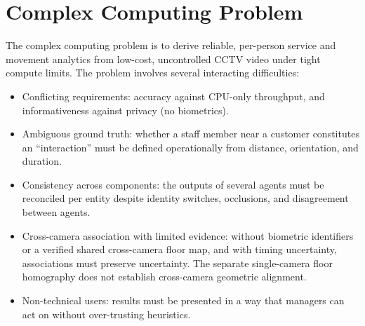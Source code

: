 \section{Complex Computing Problem}
The complex computing problem is to derive reliable, per-person service and movement analytics from low-cost, uncontrolled CCTV video under tight compute limits. The problem involves several interacting difficulties:
\begin{itemize}
\item Conflicting requirements: accuracy against CPU-only throughput, and informativeness against privacy (no biometrics).
\item Ambiguous ground truth: whether a staff member near a customer constitutes an ``interaction'' must be defined operationally from distance, orientation, and duration.
\item Consistency across components: the outputs of several agents must be reconciled per entity despite identity switches, occlusions, and disagreement between agents.
\item Cross-camera association with limited evidence: without biometric identifiers or a verified shared cross-camera floor map, and with timing uncertainty, associations must preserve uncertainty. The separate single-camera floor homography does not establish cross-camera geometric alignment.
\item Non-technical users: results must be presented in a way that managers can act on without over-trusting heuristics.
\end{itemize}

